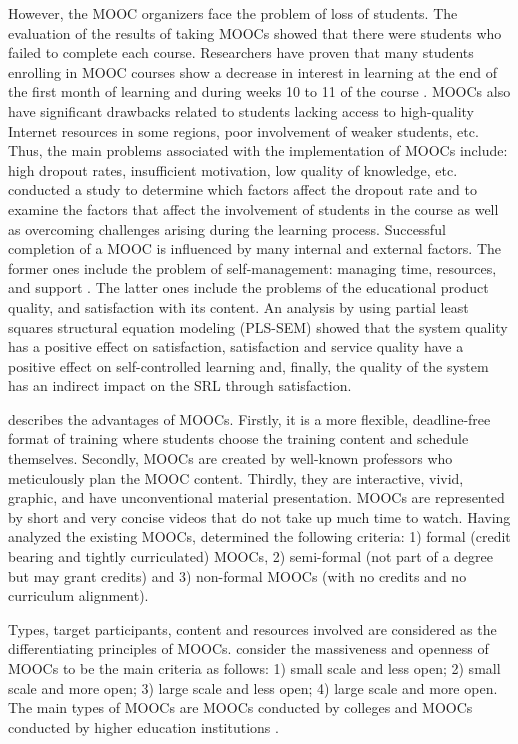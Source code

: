 \documentclass[english]{textolivre}
\begin{document}
However, the MOOC organizers face the problem of loss of students. The evaluation of the results of taking MOOCs showed that there were students who failed to complete each course. Researchers have proven that many students enrolling in MOOC courses show a decrease in interest in learning at the end of the first month of learning and during weeks 10 to 11 of the course \cite{a_shukor_using_2019}. MOOCs also have significant drawbacks related to students lacking access to high-quality Internet resources in some regions, poor involvement of weaker students, etc. Thus, the main problems associated with the implementation of MOOCs include: high dropout rates, insufficient motivation, low quality of knowledge, etc. \cite{feklistova_learners_2021} conducted a study to determine which factors affect the dropout rate and to examine the factors that affect the involvement of students in the course as well as overcoming challenges arising during the learning process. Successful completion of a MOOC is influenced by many internal and external factors. The former ones include the problem of self-management: managing time, resources, and support \cite{zhu_enhancing_2021}. The latter ones include the problems of the educational product quality, and satisfaction with its content. An analysis by \textcite[p. 3459-3461]{albelbisi_self-regulated_2021} using partial least squares structural equation modeling (PLS-SEM) showed that the system quality has a positive effect on satisfaction, satisfaction and service quality have a positive effect on self-controlled learning and, finally, the quality of the system has an indirect impact on the SRL through satisfaction.

\textcite{fan_research_2021} describes the advantages of MOOCs. Firstly, it is a more flexible, deadline-free format of training where students choose the training content and schedule themselves. Secondly, MOOCs are created by well-known professors who meticulously plan the MOOC content. Thirdly, they are interactive, vivid, graphic, and have unconventional material presentation. MOOCs are represented by short and very concise videos that do not take up much time to watch. Having analyzed the existing MOOCs, \textcite[p. 1-2]{estebas-vilaplana_role_2020} determined the following criteria: 1) formal (credit bearing and tightly curriculated) MOOCs, 2) semi-formal (not part of a degree but may grant credits) and 3) non-formal MOOCs (with no credits and no curriculum alignment).

Types, target participants, content and resources involved are considered as the differentiating principles of MOOCs. \textcite{pilli_taxonomy_2016} consider the massiveness and openness of MOOCs to be the main criteria as follows: 1) small scale and less open; 2) small scale and more open; 3) large scale and less open; 4) large scale and more open. The main types of MOOCs are MOOCs conducted by colleges and MOOCs conducted by higher education institutions \cite{berestova_mooc_2021}.
\end{document}
